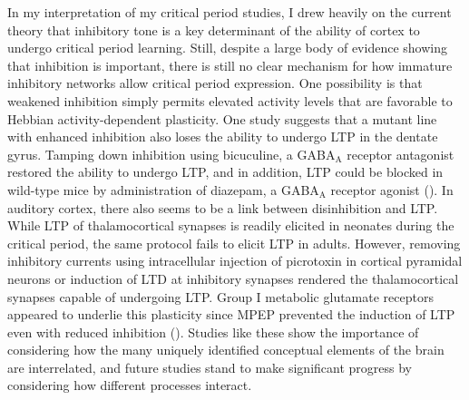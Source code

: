 In my interpretation of my critical period studies, I drew heavily on the current theory that inhibitory tone is a key determinant of the ability of cortex to undergo critical period learning. Still, despite a large body of evidence showing that inhibition is important, there is still no clear mechanism for how immature inhibitory networks allow critical period expression. One possibility is that weakened inhibition simply permits elevated activity levels that are favorable to Hebbian activity-dependent plasticity. One study suggests that a mutant line with enhanced inhibition also loses the ability to undergo LTP in the dentate gyrus. Tamping down inhibition using bicuculine, a GABA$_\mathrm{A}$ receptor antagonist restored the ability to undergo LTP, and in addition, LTP could be blocked in wild-type mice by administration of diazepam, a GABA$_\mathrm{A}$ receptor agonist (\cite{Levkovitz1999}). In auditory cortex, there also seems to be a link between disinhibition and LTP. While LTP of thalamocortical synapses is readily elicited in neonates during the critical period, the same protocol fails to elicit LTP in adults. However, removing inhibitory currents using intracellular injection of picrotoxin in cortical pyramidal neurons or induction of LTD at inhibitory synapses rendered the thalamocortical synapses capable of undergoing LTP. Group I metabolic glutamate receptors appeared to underlie this plasticity since MPEP prevented the induction of LTP even with reduced inhibition (\cite{Chun2013}). Studies like these show the importance of considering how the many uniquely identified conceptual elements of the brain are interrelated, and future studies stand to make significant progress by considering how different processes interact.